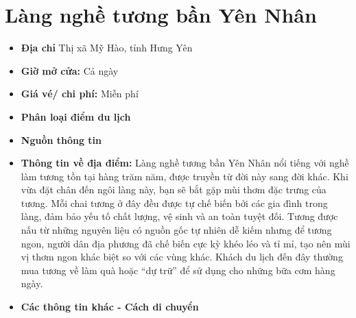 \documentclass{article}
\begin{document}
\section{Làng nghề tương bần Yên Nhân}
\begin{itemize}
    \item{\textbf{Địa chỉ}} Thị xã Mỹ Hào, tỉnh Hưng Yên

    \item{\textbf{Giờ mở cửa:}} Cả ngày

    \item{\textbf{Giá vé/ chi phí:}} Miễn phí

    \item{\textbf{Phân loại điểm du lịch}} 

    \item{\textbf{Nguồn thông tin}} 

    \item{\textbf{Thông tin về địa điểm:}} Làng nghề tương bần Yên Nhân nổi tiếng với nghề làm tương tồn tại hàng trăm năm, được truyền từ đời này sang đời khác. Khi vừa đặt chân đến ngôi làng này, bạn sẽ bắt gặp mùi thơm đặc trưng của tương. Mỗi chai tương ở đây đều được tự chế biến bởi các gia đình trong làng, đảm bảo yếu tố chất lượng, vệ sinh và an toàn tuyệt đối. Tương được nấu từ những nguyên liệu có nguồn gốc tự nhiên dễ kiếm nhưng để tương ngon, người dân địa phương đã chế biến cực kỳ khéo léo và tỉ mỉ, tạo nên mùi vị thơm ngon khác biệt so với các vùng khác. Khách du lịch đến đây thường mua tương về làm quà hoặc “dự trữ” để sử dụng cho những bữa cơm hàng ngày.
\end{itemize}

\begin{itemize}
    \item{\textbf{Các thông tin khác - Cách di chuyển}} 
\end{itemize}
\end{document}
